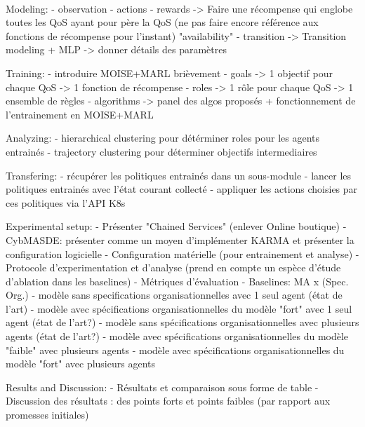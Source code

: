 \documentclass[conference]{IEEEtran}
\begin{document}
\



Modeling:
 - observation
 - actions
 - rewards -> Faire une récompense qui englobe toutes les QoS ayant pour père la QoS (ne pas faire encore référence aux fonctions de récompense pour l'instant) "availability"
 - transition -> Transition modeling + MLP -> donner détails des paramètres

Training:
 - introduire MOISE+MARL brièvement
 - goals -> 1 objectif pour chaque QoS -> 1 fonction de récompense
 - roles -> 1 rôle pour chaque QoS -> 1 ensemble de règles
 - algorithms -> panel des algos proposés + fonctionnement de l'entrainement en MOISE+MARL

Analyzing:
 - hierarchical clustering pour détérminer roles pour les agents entrainés
 - trajectory clustering pour déterminer objectifs intermediaires

Transfering:
 - récupérer les politiques entrainés dans un sous-module
 - lancer les politiques entrainés avec l'état courant collecté
 - appliquer les actions choisies par ces politiques via l'API K8s


Experimental setup:
 - Présenter "Chained Services" (enlever Online boutique)
 - CybMASDE: présenter comme un moyen d'implémenter KARMA et présenter la configuration logicielle
 - Configuration matérielle (pour entrainement et analyse)
 - Protocole d'experimentation et d'analyse (prend en compte un espèce d'étude d'ablation dans les baselines)
 - Métriques d'évaluation
 - Baselines: MA x (Spec. Org.)
    - modèle sans specifications organisationnelles avec 1 seul agent (état de l'art)
    - modèle avec spécifications organisationnelles du modèle "fort" avec 1 seul agent (état de l'art?)
    - modèle sans spécifications organisationnelles avec plusieurs agents (état de l'art?)
    - modèle avec spécifications organisationnelles du modèle "faible" avec plusieurs agents
    - modèle avec spécifications organisationnelles du modèle "fort" avec plusieurs agents

Results and Discussion:
 - Résultats et comparaison sous forme de table
 - Discussion des résultats : des points forts et points faibles (par rapport aux promesses initiales)
\end{document}
